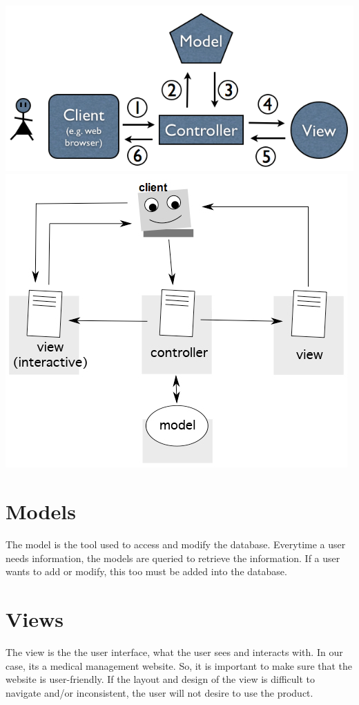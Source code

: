 \documentclass[12pt]{report}
\begin{document}
\includegraphics[scale=1]{mvc-diagram4.png}\\
\includegraphics[scale=1]{MVC-Diagram.jpg}\\

\section{Models}
The model is the tool used to access and modify the database. Everytime a user needs information, the models are queried to retrieve the information. If a user wants to add or modify, this too must be added into the database. 

\section{Views}
The view is the the user interface, what the user sees and interacts with. In our case, its a medical management website. So, it is important to make sure that the website is user-friendly. If the layout and design of the view is difficult to navigate and/or inconsistent, the user will not desire to use the product. 
\end{document}
